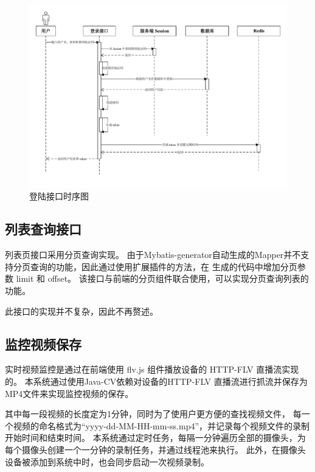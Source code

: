 \begin{figure}[ht]
    \centering
    \includegraphics[width=0.9\linewidth]{./Figure/IMG_login_seq.pdf}
    \caption{登陆接口时序图}\label{Fig:login_seq}
\end{figure}

\subsection{列表查询接口}
列表页接口采用分页查询实现。
由于Mybatis-generator自动生成的Mapper并不支持分页查询的功能，因此通过使用扩展插件的方法，在
生成的代码中增加分页参数 limit 和 offset。
该接口与前端的分页组件联合使用，可以实现分页查询列表的功能。

此接口的实现并不复杂，因此不再赘述。

\subsection{监控视频保存}
实时视频监控是通过在前端使用 flv.js 组件播放设备的 HTTP-FLV 直播流实现的。
本系统通过使用Java-CV依赖对设备的HTTP-FLV 直播流进行抓流并保存为MP4文件来实现监控视频的保存。

其中每一段视频的长度定为1分钟，同时为了使用户更方便的查找视频文件，
每一个视频的命名格式为“yyyy-dd-MM-HH-mm-ss.mp4”，并记录每个视频文件的录制开始时间和结束时间。
本系统通过定时任务，每隔一分钟遍历全部的摄像头，为每个摄像头创建一个一分钟的录制任务，并通过线程池来执行。
此外，在摄像头设备被添加到系统中时，也会同步启动一次视频录制。

